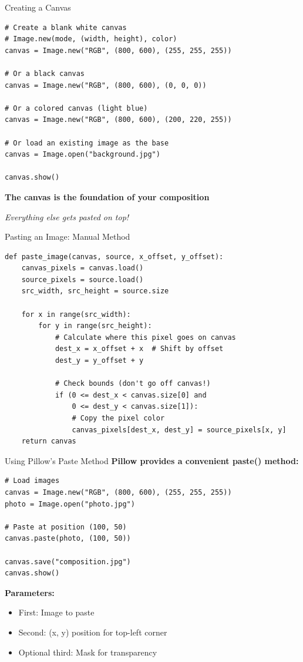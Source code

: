 \documentclass{csbeamer}
\begin{document}
\begin{frame}[fragile]{Creating a Canvas}
    \begin{lstlisting}
# Create a blank white canvas
# Image.new(mode, (width, height), color)
canvas = Image.new("RGB", (800, 600), (255, 255, 255))

# Or a black canvas
canvas = Image.new("RGB", (800, 600), (0, 0, 0))

# Or a colored canvas (light blue)
canvas = Image.new("RGB", (800, 600), (200, 220, 255))

# Or load an existing image as the base
canvas = Image.open("background.jpg")

canvas.show()
    \end{lstlisting}

\textbf{The \textcolor{stfxblue}{canvas} is the foundation of your composition}

\textit{Everything else gets pasted on top!}
\end{frame}

\begin{frame}[fragile]{Pasting an Image: Manual Method}
    \begin{lstlisting}
def paste_image(canvas, source, x_offset, y_offset):
    canvas_pixels = canvas.load()
    source_pixels = source.load()
    src_width, src_height = source.size

    for x in range(src_width):
        for y in range(src_height):
            # Calculate where this pixel goes on canvas
            dest_x = x_offset + x  # Shift by offset
            dest_y = y_offset + y

            # Check bounds (don't go off canvas!)
            if (0 <= dest_x < canvas.size[0] and
                0 <= dest_y < canvas.size[1]):
                # Copy the pixel color
                canvas_pixels[dest_x, dest_y] = source_pixels[x, y]
    return canvas
    \end{lstlisting}
\end{frame}

\begin{frame}[fragile]{Using Pillow's Paste Method}
    \textbf{Pillow provides a convenient paste() method:}

    \begin{lstlisting}
# Load images
canvas = Image.new("RGB", (800, 600), (255, 255, 255))
photo = Image.open("photo.jpg")

# Paste at position (100, 50)
canvas.paste(photo, (100, 50))

canvas.save("composition.jpg")
canvas.show()
    \end{lstlisting}


    \pause

    \textbf{Parameters:}
    \begin{itemize}
        \item<2-> First: Image to paste
        \item<3-> Second: \textcolor{marigold}{(x, y) position} for top-left corner
        \item<4-> Optional third: Mask for transparency
    \end{itemize}
\end{frame}
\end{document}
